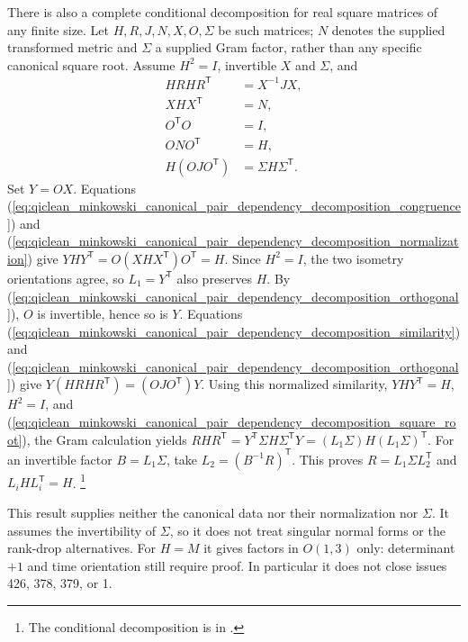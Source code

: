 \documentclass{article}
\begin{document}
There is also a complete conditional decomposition for real square matrices
of any finite size. Let $H,R,J,N,X,O,\Sigma$ be such matrices;
$N$ denotes the supplied transformed metric and $\Sigma$ a supplied Gram
factor, rather than any specific canonical square root. Assume $H^2=I$,
invertible $X$ and $\Sigma$, and
\begin{align}
    HRHR^{\mathsf T}&=X^{-1}JX,
    \label{eq:qiclean_minkowski_canonical_pair_dependency_decomposition_similarity}\\
    XHX^{\mathsf T}&=N,
    \label{eq:qiclean_minkowski_canonical_pair_dependency_decomposition_congruence}\\
    O^{\mathsf T}O&=I,
    \label{eq:qiclean_minkowski_canonical_pair_dependency_decomposition_orthogonal}\\
    ONO^{\mathsf T}&=H,
    \label{eq:qiclean_minkowski_canonical_pair_dependency_decomposition_normalization}\\
    H(OJO^{\mathsf T})&=\Sigma H\Sigma^{\mathsf T}.
    \label{eq:qiclean_minkowski_canonical_pair_dependency_decomposition_square_root}
\end{align}
Set $Y=OX$. Equations
(\ref{eq:qiclean_minkowski_canonical_pair_dependency_decomposition_congruence}) and
(\ref{eq:qiclean_minkowski_canonical_pair_dependency_decomposition_normalization})
give $YHY^{\mathsf T}=O(XHX^{\mathsf T})O^{\mathsf T}=H$.
Since $H^2=I$, the two isometry orientations agree, so
$L_1=Y^{\mathsf T}$ also preserves $H$.
By (\ref{eq:qiclean_minkowski_canonical_pair_dependency_decomposition_orthogonal}),
$O$ is invertible, hence so is $Y$.
Equations
(\ref{eq:qiclean_minkowski_canonical_pair_dependency_decomposition_similarity}) and
(\ref{eq:qiclean_minkowski_canonical_pair_dependency_decomposition_orthogonal})
give $Y(HRHR^{\mathsf T})=(OJO^{\mathsf T})Y$.
Using this normalized similarity, $YHY^{\mathsf T}=H$, $H^2=I$, and
(\ref{eq:qiclean_minkowski_canonical_pair_dependency_decomposition_square_root}),
the Gram calculation yields
$RHR^{\mathsf T}=Y^{\mathsf T}\Sigma H\Sigma^{\mathsf T}Y
=(L_1\Sigma)H(L_1\Sigma)^{\mathsf T}$.
For an invertible factor $B=L_1\Sigma$, take
$L_2=(B^{-1}R)^{\mathsf T}$. This proves
$R=L_1\Sigma L_2^{\mathsf T}$ and $L_iHL_i^{\mathsf T}=H$.
\footnote{The conditional decomposition is
 in
.}

This result supplies neither the canonical data nor their normalization nor
$\Sigma$. It assumes the invertibility of $\Sigma$, so it does not treat
singular normal forms or the rank-drop alternatives. For $H=M$ it gives
factors in $O(1,3)$ only: determinant $+1$ and time orientation still require
proof. In particular it does not close issues 426, 378, 379, or 1.
\end{document}
